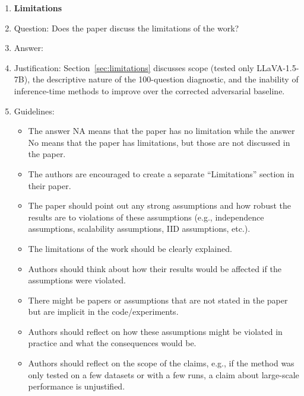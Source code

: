 \begin{enumerate}
\item {\bf Limitations}
\item[] Question: Does the paper discuss the limitations of the work?
\item[] Answer: \answerYes{}
\item[] Justification: Section~\ref{sec:limitations} discusses scope (tested
only LLaVA-1.5-7B), the descriptive nature of the 100-question diagnostic,
and the inability of inference-time methods to improve over the corrected
adversarial baseline.
\item[] Guidelines:
\begin{itemize}
    \item The answer NA means that the paper has no limitation while the answer
    No means that the paper has limitations, but those are not discussed in
    the paper.
    \item The authors are encouraged to create a separate ``Limitations'' section
    in their paper.
    \item The paper should point out any strong assumptions and how robust the
    results are to violations of these assumptions (e.g., independence
    assumptions, scalability assumptions, IID assumptions, etc.).
    \item The limitations of the work should be clearly explained.
    \item Authors should think about how their results would be affected if the
    assumptions were violated.
    \item There might be papers or assumptions that are not stated in the paper
    but are implicit in the code/experiments.
    \item Authors should reflect on how these assumptions might be violated in
    practice and what the consequences would be.
    \item Authors should reflect on the scope of the claims, e.g., if the method
    was only tested on a few datasets or with a few runs, a claim about
    large-scale performance is unjustified.
\end{itemize}


\end{enumerate}
